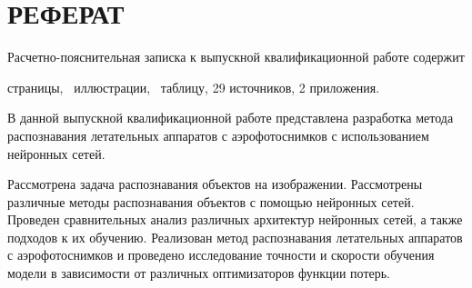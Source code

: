\setcounter{page}{5}

\chapter*{РЕФЕРАТ}

Расчетно-пояснительная записка к выпускной квалификационной работе содержит  \begin{NoHyper}\pageref{LastPage}\end{NoHyper} страницы, \totfig~иллюстрации, \tottab~таблицу, 29 источников, 2 приложения.

В данной выпускной квалификационной работе представлена разработка метода распознавания летательных аппаратов с аэрофотоснимков с использованием нейронных сетей.

Рассмотрена задача распознавания объектов на изображении. Рассмотрены различные методы распознавания объектов с помощью нейронных сетей. Проведен сравнительных анализ различных архитектур нейронных сетей, а также подходов к их обучению. Реализован метод распознавания летательных аппаратов с аэрофотоснимков и проведено исследование точности и скорости обучения модели в зависимости от различных оптимизаторов функции потерь.
